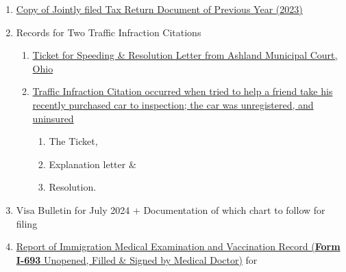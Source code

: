 \begin{enumerate}[label=\textbf{ Exhibit-\arabic*}]
    \item \hyperref[exhibit_tax_2023]{Copy of Jointly filed Tax Return Document of Previous Year (2023)}

    \item Records for Two Traffic Infraction Citations
    


    \begin{enumerate}[label=\roman*.]
        \item \hyperref[exhibit13a]{Ticket for Speeding \& Resolution Letter from Ashland Municipal Court, Ohio}
        \item \hyperref[exhibit13b]{Traffic Infraction Citation occurred when tried to help a friend take his recently purchased car to inspection; the car was unregistered, and uninsured}\begin{enumerate}[label=\alph*.]
        \item The Ticket, 
        \item Explanation letter \& 
        \item Resolution.
        \end{enumerate}
        
        
    \end{enumerate}

    \item Visa Bulletin for July 2024 + Documentation of which chart to follow for filing
    \item \hyperref[exhibit14]{Report of Immigration Medical Examination and Vaccination Record (\textbf{Form I-693} Unopened, Filled \& Signed by Medical Doctor)} for \textit{\pApplicant}
\end{enumerate}